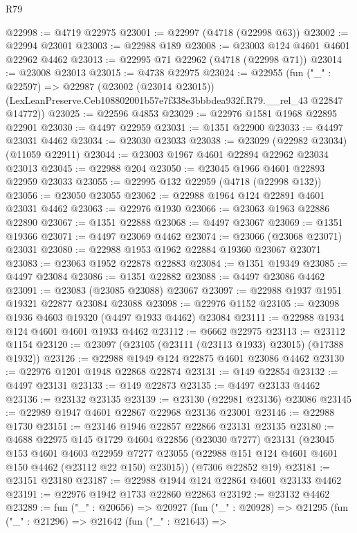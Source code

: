 \begin{lexlean}{R79}
\begin{coremodule}
@22998 := @4719 @22975
@23001 := @22997 (@4718 (@22998 @63))
@23002 := @22994 @23001
@23003 := @22988 @189
@23008 := @23003 @124 @4601 @4601 @22962 @4462
@23013 := @22995 @71 @22962 (@4718 (@22998 @71))
@23014 := @23008 @23013
@23015 := @4738 @22975
@23024 := @22955
    (fun ("_" : @22597) =>
    @22987
      (@23002 (@23014 @23015))
      (LexLeanPreserve.Ceb108802001b57e7f338e3bbbdea932f.R79.__rel_43 @22847 @14772))
@23025 := @22596 @4853
@23029 := @22976 @1581 @1968 @22895 @22901
@23030 := @4497 @22959
@23031 := @1351 @22900
@23033 := @4497 @23031 @4462
@23034 := @23030 @23033
@23038 := @23029 (@22982 @23034) (@11059 @22911)
@23044 := @23003 @1967 @4601 @22894 @22962 @23034 @23013
@23045 := @22988 @204
@23050 := @23045 @1966 @4601 @22893 @22959 @23033
@23055 := @22995 @132 @22959 (@4718 (@22998 @132))
@23056 := @23050 @23055
@23062 := @22988 @1964 @124 @22891 @4601 @23031 @4462
@23063 := @22976 @1930
@23066 := @23063 @1963 @22886 @22890
@23067 := @1351 @22888
@23068 := @4497 @23067
@23069 := @1351 @19366
@23071 := @4497 @23069 @4462
@23074 := @23066 (@23068 @23071) @23031
@23080 := @22988 @1953 @1962 @22884 @19360 @23067 @23071
@23083 := @23063 @1952 @22878 @22883
@23084 := @1351 @19349
@23085 := @4497 @23084
@23086 := @1351 @22882
@23088 := @4497 @23086 @4462
@23091 := @23083 (@23085 @23088) @23067
@23097 := @22988 @1937 @1951 @19321 @22877 @23084 @23088
@23098 := @22976 @1152
@23105 := @23098 @1936 @4603 @19320 (@4497 @1933 @4462) @23084
@23111 := @22988 @1934 @124 @4601 @4601 @1933 @4462
@23112 := @6662 @22975
@23113 := @23112 @1154
@23120 := @23097 (@23105 (@23111 (@23113 @1933) @23015) (@17388 @1932))
@23126 := @22988 @1949 @124 @22875 @4601 @23086 @4462
@23130 := @22976 @1201 @1948 @22868 @22874
@23131 := @149 @22854
@23132 := @4497 @23131
@23133 := @149 @22873
@23135 := @4497 @23133 @4462
@23136 := @23132 @23135
@23139 := @23130 (@22981 @23136) @23086
@23145 := @22989 @1947 @4601 @22867 @22968 @23136 @23001
@23146 := @22988 @1730
@23151 := @23146 @1946 @22857 @22866 @23131 @23135
@23180 := @4688
    @22975
    @145
    @1729
    @4604
    @22856
    (@23030 @7277)
    @23131
    (@23045
      @153
      @4601
      @4603
      @22959
      @7277
      @23055
      (@22988 @151 @124 @4601 @4601 @150 @4462 (@23112 @22 @150) @23015))
    (@7306 @22852 @19)
@23181 := @23151 @23180
@23187 := @22988 @1944 @124 @22864 @4601 @23133 @4462
@23191 := @22976 @1942 @1733 @22860 @22863
@23192 := @23132 @4462
@23289 := fun ("_" : @20656) =>
  @20927
    (fun ("_" : @20928) =>
    @21295
      (fun ("_" : @21296) =>
      @21642
        (fun ("_" : @21643) =>

\end{coremodule}
\end{lexlean}

